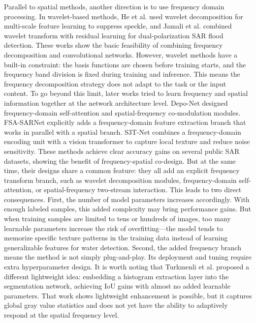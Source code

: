\documentclass[lettersize,journal]{IEEEtran}
\begin{document}
Parallel to spatial methods, another direction is to use frequency domain processing. In wavelet-based methods, He et al. \cite{He2024GRSL} used wavelet decomposition for multi-scale feature learning to suppress speckle, and Jamali et al. \cite{Jamali2024IJAG} combined wavelet transform with residual learning for dual-polarization SAR flood detection. These works show the basic feasibility of combining frequency decomposition and convolutional networks. However, wavelet methods have a built-in constraint: the basis functions are chosen before training starts, and the frequency band division is fixed during training and inference. This means the frequency decomposition strategy does not adapt to the task or the input content. To go beyond this limit, later works tried to learn frequency and spatial information together at the network architecture level. Depo-Net \cite{DepoNet2025} designed frequency-domain self-attention and spatial-frequency co-modulation modules. FSA-SARNet \cite{Zhou2026FSA-SARNet} explicitly adds a frequency-domain feature extraction branch that works in parallel with a spatial branch. S3T-Net \cite{Yang2025S3T} combines a frequency-domain encoding unit with a vision transformer to capture local texture and reduce noise sensitivity. These methods achieve clear accuracy gains on several public SAR datasets, showing the benefit of frequency-spatial co-design. But at the same time, their designs share a common feature: they all add an explicit frequency transform branch, such as wavelet decomposition modules, frequency-domain self-attention, or spatial-frequency two-stream interaction. This leads to two direct consequences. First, the number of model parameters increases accordingly. With enough labeled samples, this added complexity may bring performance gains. But when training samples are limited to tens or hundreds of images, too many learnable parameters increase the risk of overfitting—the model tends to memorize specific texture patterns in the training data instead of learning generalizable features for water detection. Second, the added frequency branch means the method is not simply plug-and-play. Its deployment and tuning require extra hyperparameter design. It is worth noting that Turkmenli et al. \cite{Turkmenli2024HistSegNet} proposed a different lightweight idea: embedding a histogram extraction layer into the segmentation network, achieving IoU gains with almost no added learnable parameters. That work shows lightweight enhancement is possible, but it captures global gray value statistics and does not yet have the ability to adaptively respond at the spatial frequency level.
\end{document}
